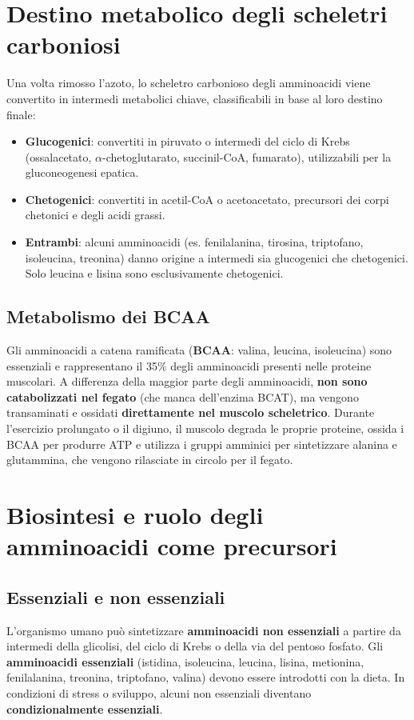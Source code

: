 \documentclass[12pt,a4paper]{report}
\begin{document}
\section{Destino metabolico degli scheletri carboniosi}
Una volta rimosso l'azoto, lo scheletro carbonioso degli amminoacidi viene convertito in intermedi metabolici chiave, classificabili in base al loro destino finale:
\begin{itemize}
\item \textbf{Glucogenici}: convertiti in piruvato o intermedi del ciclo di Krebs (ossalacetato, \(\alpha\)-chetoglutarato, succinil-CoA, fumarato), utilizzabili per la gluconeogenesi epatica.
\item \textbf{Chetogenici}: convertiti in acetil-CoA o acetoacetato, precursori dei corpi chetonici e degli acidi grassi.
\item \textbf{Entrambi}: alcuni amminoacidi (es. fenilalanina, tirosina, triptofano, isoleucina, treonina) danno origine a intermedi sia glucogenici che chetogenici. Solo leucina e lisina sono esclusivamente chetogenici.
\end{itemize}
\subsection{Metabolismo dei BCAA}
Gli amminoacidi a catena ramificata (\textbf{BCAA}: valina, leucina, isoleucina) sono essenziali e rappresentano il 35\% degli amminoacidi presenti nelle proteine muscolari. A differenza della maggior parte degli amminoacidi, \textbf{non sono catabolizzati nel fegato} (che manca dell'enzima BCAT), ma vengono transaminati e ossidati \textbf{direttamente nel muscolo scheletrico}.
Durante l'esercizio prolungato o il digiuno, il muscolo degrada le proprie proteine, ossida i BCAA per produrre ATP e utilizza i gruppi amminici per sintetizzare alanina e glutammina, che vengono rilasciate in circolo per il fegato.

\section{Biosintesi e ruolo degli amminoacidi come precursori}
\subsection{Essenziali e non essenziali}
L'organismo umano può sintetizzare \textbf{amminoacidi non essenziali} a partire da intermedi della glicolisi, del ciclo di Krebs o della via del pentoso fosfato. Gli \textbf{amminoacidi essenziali} (istidina, isoleucina, leucina, lisina, metionina, fenilalanina, treonina, triptofano, valina) devono essere introdotti con la dieta. In condizioni di stress o sviluppo, alcuni non essenziali diventano \textbf{condizionalmente essenziali}.
\end{document}
